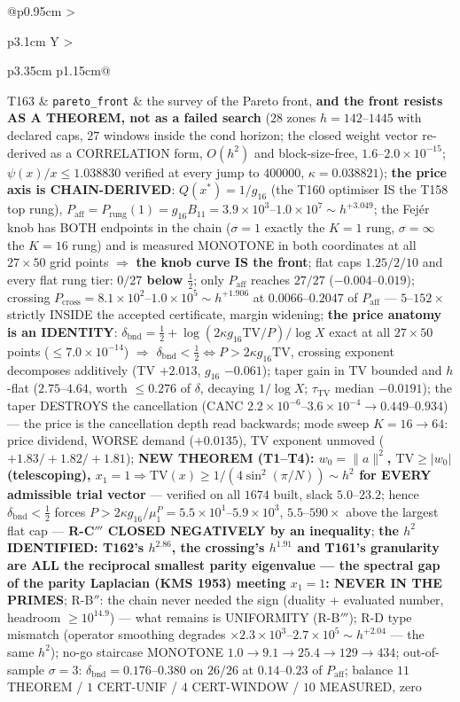 \documentclass[11pt,a4paper]{article}
\begin{document}
{\begin{xltabular}{\linewidth}{@{}p{0.95cm} >{\raggedright\arraybackslash}p{3.1cm} Y >{\raggedright\scriptsize\arraybackslash}p{3.35cm} p{1.15cm}@{}}
T163 & \texttt{\scriptsize pareto\_\allowbreak front} & the survey of the Pareto front, \textbf{and the front resists AS A THEOREM, not as a failed search} ($28$ zones $h=142$--$1445$ with declared caps, $27$ windows inside the cond horizon; the closed weight vector re-derived as a CORRELATION form, $O(h^2)$ and block-size-free, $1.6$--$2.0\times10^{-15}$; $\psi(x)/x\le1.038830$ verified at every jump to $400000$, $\kappa=0.038821$); \textbf{the price axis is CHAIN-DERIVED}: $Q(x^*)=1/g_{16}$ (the T160 optimiser IS the T158 top rung), $P_{\mathrm{aff}}=P_{\mathrm{rung}}(1)=g_{16}B_{11}=3.9\times10^{3}$--$1.0\times10^{7}\sim h^{+3.049}$; the Fej\'er knob has BOTH endpoints in the chain ($\sigma=1$ exactly the $K{=}1$ rung, $\sigma=\infty$ the $K{=}16$ rung) and is measured MONOTONE in both coordinates at all $27\times50$ grid points $\Rightarrow$ \textbf{the knob curve IS the front}; flat caps $1.25/2/10$ and every flat rung tier: \textbf{$0/27$ below $\tfrac12$}; only $P_{\mathrm{aff}}$ reaches $27/27$ ($-0.004$--$0.019$); crossing $P_{\mathrm{cross}}=8.1\times10^{2}$--$1.0\times10^{5}\sim h^{+1.906}$ at $0.0066$--$0.2047$ of $P_{\mathrm{aff}}$ --- $5$--$152\times$ strictly INSIDE the accepted certificate, margin widening; \textbf{the price anatomy is an IDENTITY}: $\delta_{\mathrm{bnd}}=\tfrac12+\log(2\kappa g_{16}\mathrm{TV}/P)/\log X$ exact at all $27\times50$ points ($\le7.0\times10^{-14}$) $\Rightarrow$ $\delta_{\mathrm{bnd}}<\tfrac12\iff P>2\kappa g_{16}\mathrm{TV}$, crossing exponent decomposes additively (TV $+2.013$, $g_{16}$ $-0.061$); taper gain in TV bounded and $h$-flat ($2.75$--$4.64$, worth $\le0.276$ of $\delta$, decaying $1/\log X$; $\tau_{\mathrm{TV}}$ median $-0.0191$); the taper DESTROYS the cancellation (CANC $2.2\times10^{-6}$--$3.6\times10^{-4}\to0.449$--$0.934$) --- the price is the cancellation depth read backwards; mode sweep $K=16\to64$: price dividend, WORSE demand ($+0.0135$), TV exponent unmoved ($+1.83/+1.82/+1.81$); \textbf{NEW THEOREM (T1--T4): $w_0=\|a\|^2$, $\mathrm{TV}\ge|w_0|$ (telescoping), $x_1=1\Rightarrow\mathrm{TV}(x)\ge1/(4\sin^2(\pi/N))\sim h^2$ for EVERY admissible trial vector} --- verified on all $1674$ built, slack $5.0$--$23.2$; hence $\delta_{\mathrm{bnd}}<\tfrac12$ forces $P>2\kappa g_{16}/\mu^P_1=5.5\times10^{1}$--$5.9\times10^{3}$, $5.5$--$590\times$ above the largest flat cap --- \textbf{R-C$'''$ CLOSED NEGATIVELY by an inequality}; \textbf{the $h^2$ IDENTIFIED: T162's $h^{2.86}$, the crossing's $h^{1.91}$ and T161's granularity are ALL the reciprocal smallest parity eigenvalue --- the spectral gap of the parity Laplacian (KMS 1953) meeting $x_1=1$: NEVER IN THE PRIMES}; R-B$''$: the chain never needed the sign (duality + evaluated number, headroom $\ge10^{14.9}$) --- what remains is UNIFORMITY (R-B$'''$); R-D type mismatch (operator smoothing degrades $\times2.3\times10^{3}$--$2.7\times10^{5}\sim h^{+2.04}$ --- the same $h^2$); no-go staircase MONOTONE $1.0\to9.1\to25.4\to129\to434$; out-of-sample $\sigma=3$: $\delta_{\mathrm{bnd}}=0.176$--$0.380$ on $26/26$ at $0.14$--$0.23$ of $P_{\mathrm{aff}}$; balance $11$ THEOREM / $1$ CERT-UNIF / $4$ CERT-WINDOW / $10$ MEASURED, zero 
\end{xltabular}}
\end{document}
